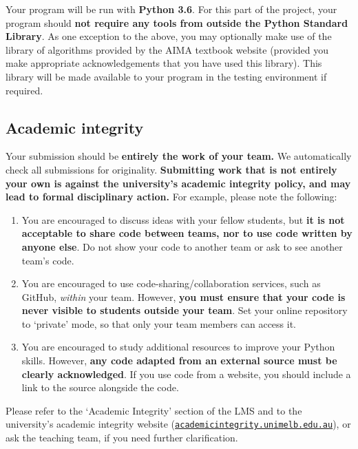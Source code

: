\documentclass[]{article}
\begin{document}

Your program will be run with \textbf{Python 3.6}. For this part of
the project, your program should \textbf{not require any tools from
outside the Python Standard Library}. As one exception to the above,
you may optionally make use of the library of algorithms provided by
the AIMA textbook website (provided you make appropriate
acknowledgements that you have used this library). This library will
be made available to your program in the testing environment if
required.

\subsection*{Academic integrity}

Your submission should be \textbf{entirely the work of your team.}
We automatically check all submissions for originality.
\textbf{Submitting work that is not entirely your own is against the
university's academic integrity policy, and may lead to formal
disciplinary action.}
For example, please note the following:
\begin{enumerate}
\itemsep0ex
\item
You are encouraged to discuss ideas with your fellow students, but
\textbf{it is not acceptable to share code between teams, nor to use
code written by anyone else}.
Do not show your code to another team or ask to see another team's code.
\item
You are encouraged to use code-sharing/collaboration services, such as
GitHub, \emph{within} your team.
However, \textbf{you must ensure that your code is never visible to
students outside your team}.
Set your online repository to `private' mode, so that only your team
members can access it.
\item
You are encouraged to study additional resources to improve your Python
skills.
However, \textbf{any code adapted from an external source must be clearly
acknowledged}.
If you use code from a website, you should include a link to the source
alongside the code.
\end{enumerate}
Please refer to the `Academic Integrity' section of the LMS and to the
university's academic integrity website
(\href{https://academicintegrity.unimelb.edu.au}{\texttt{academicintegrity.unimelb.edu.au}}),
or ask the teaching team,
if you need further clarification.
\end{document}

